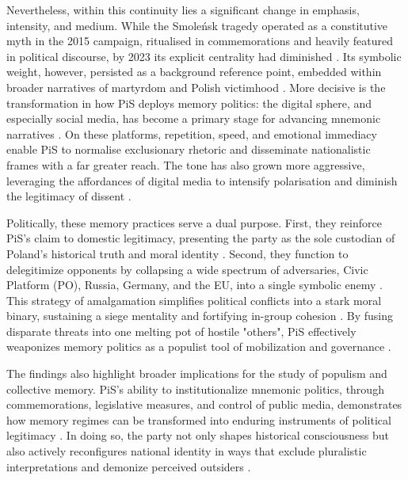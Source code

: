 Nevertheless, within this continuity lies a significant change in emphasis, intensity, and medium. While the Smoleńsk tragedy operated as a constitutive myth in the 2015 campaign, ritualised in commemorations and heavily featured in political discourse, by 2023 its explicit centrality had diminished \citep{rybicki_2025_16933320}. Its symbolic weight, however, persisted as a background reference point, embedded within broader narratives of martyrdom and Polish victimhood \citep{woycicka_mnemonic_2024}. More decisive is the transformation in how PiS deploys memory politics: the digital sphere, and especially social media, has become a primary stage for advancing mnemonic narratives \citep{jamieson_theorising_2002}. On these platforms, repetition, speed, and emotional immediacy enable PiS to normalise exclusionary rhetoric and disseminate nationalistic frames with a far greater reach. The tone has also grown more aggressive, leveraging the affordances of digital media to intensify polarisation and diminish the legitimacy of dissent \citep{meijen_populist_2024}.

Politically, these memory practices serve a dual purpose. First, they reinforce PiS’s claim to domestic legitimacy, presenting the party as the sole custodian of Poland’s historical truth and moral identity \citep{korycki_memory_2017}. Second, they function to delegitimize opponents by collapsing a wide spectrum of adversaries,  Civic Platform (PO), Russia, Germany, and the EU, into a single symbolic enemy \citep{mazzini_three-dimensional_2018}. This strategy of amalgamation simplifies political conflicts into a stark moral binary, sustaining a siege mentality and fortifying in-group cohesion \citep{bernhard_notitle_2014}. By fusing disparate threats into one melting pot of hostile "others", PiS effectively weaponizes memory politics as a populist tool of mobilization and governance \citep{woycicka_mnemonic_2024}.

The findings also highlight broader implications for the study of populism and collective memory. PiS’s ability to institutionalize mnemonic politics, through commemorations, legislative measures, and control of public media, demonstrates how memory regimes can be transformed into enduring instruments of political legitimacy \citep{zuk_anti-semitic_2023}. In doing so, the party not only shapes historical consciousness but also actively reconfigures national identity in ways that exclude pluralistic interpretations and demonize perceived outsiders \citep{mazzini_three-dimensional_2018}.

